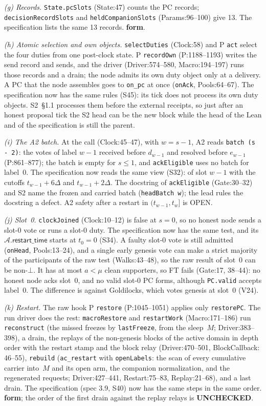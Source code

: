 \documentclass{article}
\newcommand{\AC}{\mathcal A}
\newcommand{\fname}[1]{\text{\textsc{#1}}}
\newcommand{\restartTime}{\mathsf{restart\_time}}
\newcommand{\nm}[1]{\nolinkurl{#1}}
\newcommand{\Fm}{\textbf{form}}
\newcommand{\UC}{\textbf{UNCHECKED}}
\begin{document}
\emph{(g) Records.}  \nm{State.pcSlots} (State:47) counts the PC records;
\nm{decisionRecordSlots} and \nm{heldCompanionSlots} (Params:96--100)
give 13.  The specification lists the same 13 records.  \Fm.

\emph{(h) Atomic selection and own objects.}  \nm{selectDuties}
(Clock:58) and P \nm{act} select the four duties from one post-clock
state.  P \nm{recordOwn} (P:1188--1193) writes the send record and sends,
and the driver (Driver:574--580, Macro:194--197) runs those records and a
drain; the node admits its own duty object only at a delivery.  A PC that the
node assembles goes to \nm{on\_pc} at once (\nm{onAck}, Pools:64--67).
The specification now has the same rules (S45): its tick does not
process its own duty objects.  S2~\S1.1 processes them before the external receipts, so
just after an honest proposal tick the S2 head can be the new block while
the head of the Lean and of the specification is still the parent.

\emph{(i) The A2 batch.}  At the call (Clock:45--47), with $w=s-1$, A2
reads \nm{batch (s - 2)}: the votes of label $w-1$ received before
$d_{w-1}$ and resolved before $e_{w-1}$ (P:861--877); the batch is empty
for $s\leq1$, and \nm{ackEligible} uses no batch for label~0.  The
specification now reads the same view (S32): \fname{vote\_view} of slot
$w-1$ with the cutoffs $t_{w-1}+6\Delta$ and $t_{w-1}+2\Delta$.  The
docstring of \nm{ackEligible} (Gate:30--32) and S2 name the frozen and
carried batch (\nm{headBatch w}); the lead rules the docstring a defect.
A2 safety after a restart in $(t_{w-1},t_w]$ is OPEN.

\emph{(j) Slot~0.}  \nm{clockJoined} (Clock:10--12) is false at $s=0$, so
no honest node sends a slot-0 vote or runs a slot-0 duty.  The
specification now has the same test, and its $\AC.\restartTime$ starts at
$t_0=0$ (S34).  A faulty slot-0 vote is still admitted (\nm{onHead},
Pools:13--24), and a single early genesis vote can make a strict majority
of the participants of the raw test (Walks:43--48), so the raw result of
slot~0 can be non-$\bot$.  It has at most $a<\mu$ clean supporters, so FT
fails (Gate:17, 38--44): no honest node acks slot~0, and no valid slot-0
PC forms, although \nm{PC.valid} accepts label~0.  The difference is
against Goldilocks, which votes genesis at slot~0 (V24).

\emph{(k) Restart.}  The raw hook P \nm{restore} (P:1045--1051) applies
only \nm{restorePC}.  The run driver does the rest: \nm{macroRestore} and
\nm{restartWork} (Macro:171--186) run \nm{reconstruct} (the missed freezes
by \nm{lastFreeze}, from the sleep~$M$; Driver:383--398), a drain, the
replays of the non-genesis blocks of the active domain in depth order with
the restart stamp and the block relay (Driver:470--501, BlockCallback:
46--55), \nm{rebuild} (\nm{ac\_restart} with \nm{openLabels}: the scan of
every cumulative carrier into~$M$ and its open arm, the companion
normalization, and the regenerated requests; Driver:427--441,
Restart:75--83, Replay:21--68), and a last drain.  The specification (spec
3.9, S40) now has the same steps in the same order.  \Fm; the order of the
first drain against the replay relays is \UC.
\end{document}

